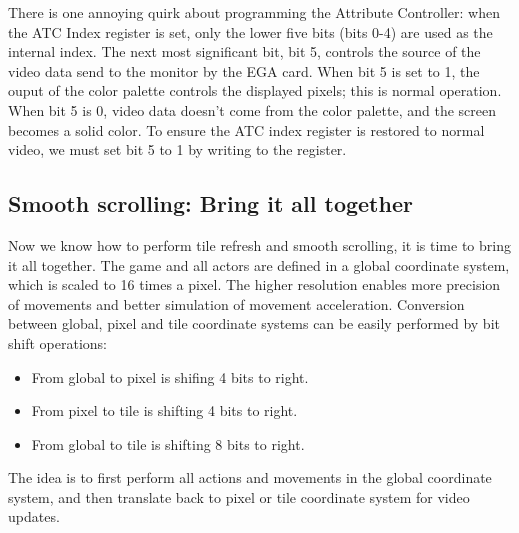 \documentclass[book.tex]{subfiles}
\begin{document}
There is one annoying quirk about programming the Attribute Controller: when the ATC Index register is set, only the lower five bits (bits 0-4) are used as the internal index. The next most significant bit, bit 5, controls the source of the video data send to the monitor by the EGA card. When bit 5 is set to 1, the ouput of the color palette controls the displayed pixels; this is normal operation. When bit 5 is 0, video data doesn't come from the color palette, and the screen becomes a solid color. To ensure the ATC index register is restored to normal video, we must set bit 5 to 1 by writing  to the register.\\ 

\begin{minipage}{\textwidth}
  
  \end{minipage}
  \label{ega_pel_pan}
  \par

\subsection{Smooth scrolling: Bring it all together}
Now we know how to perform tile refresh and smooth scrolling, it is time to bring it all together. The game and all actors are defined in a global coordinate system, which is scaled to 16 times a pixel. The higher resolution enables more precision of movements and better simulation of movement acceleration. Conversion between global, pixel and tile coordinate systems can be easily performed by bit shift operations:
\begin{itemize}
\item From global to pixel is shifing 4 bits to right.
\item From pixel to tile is shifting 4 bits to right.
\item From global to tile is shifting 8 bits to right.
\end{itemize}

The idea is to first perform all actions and movements in the global coordinate system, and then translate back to pixel or tile coordinate system for video updates. \\
\begin{minipage}{\textwidth}
  
  \end{minipage}
  \label{ega_refresh}
  \par
\end{document}
